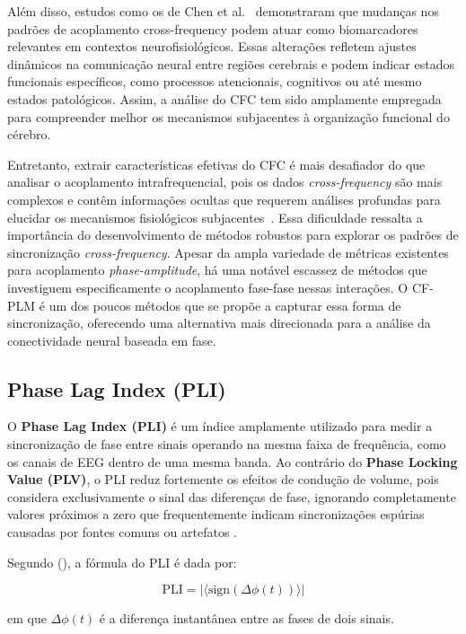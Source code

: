 Além disso, estudos como os de Chen et al.~\cite{chen2023multiple} demonstraram que mudanças nos padrões de acoplamento cross-frequency podem atuar como biomarcadores relevantes em contextos neurofisiológicos. Essas alterações refletem ajustes dinâmicos na comunicação neural entre regiões cerebrais e podem indicar estados funcionais específicos, como processos atencionais, cognitivos ou até mesmo estados patológicos. Assim, a análise do CFC tem sido amplamente empregada para compreender melhor os mecanismos subjacentes à organização funcional do cérebro.

Entretanto, extrair características efetivas do CFC é mais desafiador do que analisar o acoplamento intrafrequencial, pois os dados \textit{cross-frequency} são mais complexos e contêm informações ocultas que requerem análises profundas para elucidar os mecanismos fisiológicos subjacentes~\cite{ren2022multi}. Essa dificuldade ressalta a importância do desenvolvimento de métodos robustos para explorar os padrões de sincronização \textit{cross-frequency}. Apesar da ampla variedade de métricas existentes para acoplamento \textit{phase-amplitude}, há uma notável escassez de métodos que investiguem especificamente o acoplamento fase-fase nessas interações. O CF-PLM é um dos poucos métodos que se propõe a capturar essa forma de sincronização, oferecendo uma alternativa mais direcionada para a análise da conectividade neural baseada em fase.

\subsection{Phase Lag Index (PLI)}

O \textbf{Phase Lag Index (PLI)} é um índice amplamente utilizado para medir a sincronização de fase entre sinais operando na mesma faixa de frequência, como os canais de EEG dentro de uma mesma banda. Ao contrário do \textbf{Phase Locking Value (PLV)}, o PLI reduz fortemente os efeitos de condução de volume, pois considera exclusivamente o sinal das diferenças de fase, ignorando completamente valores próximos a zero que frequentemente indicam sincronizações espúrias causadas por fontes comuns ou artefatos \cite{seraj2018cerebral}.

Segundo \citeauthor{seraj2018cerebral} (\citeyear{seraj2018cerebral}), a fórmula do PLI é dada por:

\[
\text{PLI} = |\langle \text{sign}(\Delta\phi(t)) \rangle|
\]

em que \(\Delta\phi(t)\) é a diferença instantânea entre as fases de dois sinais.

